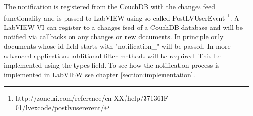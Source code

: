 The notification is registered from the CouchDB with the changes feed functionality and is passed to LabVIEW using so called PostLVUserEvent \footnote{http://zone.ni.com/reference/en-XX/help/371361F-01/lvexcode/postlvuserevent/}. A LabVIEW VI can register to a changes feed of a CouchDB database and will be notified via callbacks on any changes or new documents. In principle only documents whose id field starts with "notification\_" will be passed. In more advanced applications additional filter methods will be required. This be implemented using the types field. To see how the notification process is implemented in LabVIEW see chapter \ref{section:implementation}.